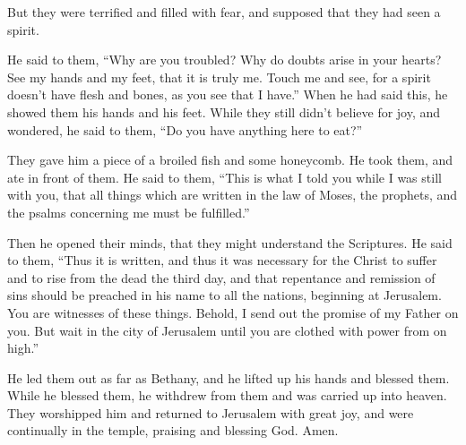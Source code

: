  But they were terrified and filled with fear, and supposed
that they had seen a spirit.

 He said to them, ``Why are you troubled? Why do doubts
arise in your hearts?  See my hands and my feet, that it is
truly me. Touch me and see, for a spirit doesn't have flesh and bones,
as you see that I have.''  When he had said this, he showed
them his hands and his feet.  While they still didn't
believe for joy, and wondered, he said to them, ``Do you have anything
here to eat?''

 They gave him a piece of a broiled fish and some
honeycomb.  He took them, and ate in front of them.
 He said to them, ``This is what I told you while I was
still with you, that all things which are written in the law of Moses,
the prophets, and the psalms concerning me must be fulfilled.''

 Then he opened their minds, that they might understand the
Scriptures.  He said to them, ``Thus it is written, and
thus it was necessary for the Christ to suffer and to rise from the dead
the third day,  and that repentance and remission of sins
should be preached in his name to all the nations, beginning at
Jerusalem.  You are witnesses of these things.
 Behold, I send out the promise of my Father on you. But
wait in the city of Jerusalem until you are clothed with power from on
high.''

 He led them out as far as Bethany, and he lifted up his
hands and blessed them.  While he blessed them, he withdrew
from them and was carried up into heaven.  They worshipped
him and returned to Jerusalem with great joy,  and were
continually in the temple, praising and blessing God. Amen.
